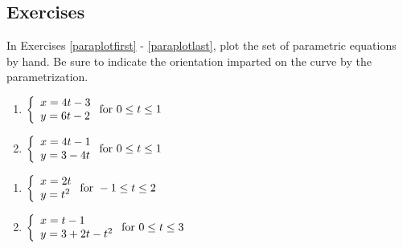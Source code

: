 \newpage

\subsection{Exercises}

In Exercises \ref{paraplotfirst} - \ref{paraplotlast}, plot the set of parametric equations by hand. Be sure to indicate the orientation imparted on the curve by the parametrization.  

\begin{multicols}{2} \raggedcolumns 

\begin{enumerate}

\item ${\displaystyle \left\{ \begin{array}{l} x = 4t-3 \\ y = 6t-2 \end{array} \right. \vspace{.25in} \mbox{for } 0 \leq t \leq 1}$ \label{paraplotfirst}
\item ${\displaystyle \left\{ \begin{array}{l} x = 4t-1 \\ y = 3-4t \end{array} \right. \vspace{.25in} \mbox{for } 0 \leq t \leq 1}$

\setcounter{HW}{\value{enumi}}
\end{enumerate}
\end{multicols}

\begin{multicols}{2} \raggedcolumns 
\begin{enumerate}
\setcounter{enumi}{\value{HW}}
\item ${\displaystyle \left\{ \begin{array}{l} x = 2t \\ y = t^2 \end{array} \right. \vspace{.25in} \mbox{for } -1 \leq t \leq 2}$
\item ${\displaystyle \left\{ \begin{array}{l} x = t-1 \\ y = 3+2t-t^2 \end{array} \right. \vspace{.25in} \mbox{for } 0 \leq t \leq 3}$

\setcounter{HW}{\value{enumi}}
\end{enumerate}
\end{multicols}



